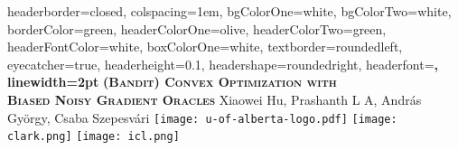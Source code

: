 \documentclass[landscape,a0paper,fontscale=0.285]{baposter} %
\begin{document}
\begin{poster}
{
headerborder=closed, %
colspacing=1em, %
bgColorOne=white, %
bgColorTwo=white, %
borderColor=green, %
headerColorOne=olive, %
headerColorTwo=green, %
headerFontColor=white, %
boxColorOne=white, %
textborder=roundedleft, %
eyecatcher=true, %
headerheight=0.1\textheight, %
headershape=roundedright, %
headerfont=\Large\bf\textsc, %
linewidth=2pt %
}
%
{}
{\bf\textsc{(Bandit) Convex Optimization with\\ Biased Noisy Gradient Oracles}\vspace{0.2em}} %
{ Xiaowei  Hu, Prashanth L A, Andr\'as Gy\"orgy, Csaba Szepesv\'ari } %
{\texttt{[image: u-of-alberta-logo.pdf]}
\hspace{12pt}
\texttt{[image: clark.png]}
\hspace{12pt}
\texttt{[image: icl.png]}} %




\end{poster}
\end{document}
